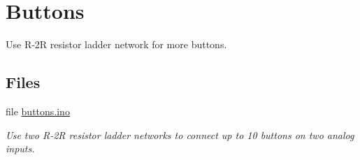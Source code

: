 \hypertarget{group__buttons}{}\section{Buttons}
\label{group__buttons}


Use R-\/2R resistor ladder network for more buttons.  


\subsection*{Files}
\begin{DoxyCompactItemize}
\item 
file \hyperlink{buttons_8ino}{buttons.\+ino}
\begin{DoxyCompactList}\small\item\em Use two R-\/2R resistor ladder networks to connect up to 10 buttons on two analog inputs. \end{DoxyCompactList}\end{DoxyCompactItemize}
